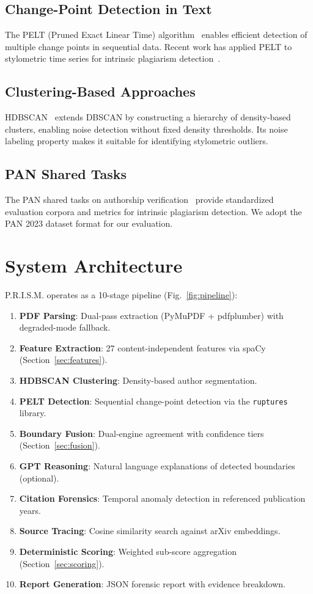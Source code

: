 \documentclass[conference]{IEEEtran}
\begin{document}
\subsection{Change-Point Detection in Text}
The PELT (Pruned Exact Linear Time) algorithm~\cite{killick2012} enables efficient detection of multiple change points in sequential data. Recent work has applied PELT to stylometric time series for intrinsic plagiarism detection~\cite{tschuggnall2017}.

\subsection{Clustering-Based Approaches}
HDBSCAN~\cite{campello2013} extends DBSCAN by constructing a hierarchy of density-based clusters, enabling noise detection without fixed density thresholds. Its noise labeling property makes it suitable for identifying stylometric outliers.

\subsection{PAN Shared Tasks}
The PAN shared tasks on authorship verification~\cite{kestemont2021} provide standardized evaluation corpora and metrics for intrinsic plagiarism detection. We adopt the PAN 2023 dataset format for our evaluation.

\section{System Architecture}
\label{sec:architecture}

P.R.I.S.M. operates as a 10-stage pipeline (Fig.~\ref{fig:pipeline}):

\begin{enumerate}
    \item \textbf{PDF Parsing}: Dual-pass extraction (PyMuPDF + pdfplumber) with degraded-mode fallback.
    \item \textbf{Feature Extraction}: 27 content-independent features via spaCy (Section~\ref{sec:features}).
    \item \textbf{HDBSCAN Clustering}: Density-based author segmentation.
    \item \textbf{PELT Detection}: Sequential change-point detection via the \texttt{ruptures} library.
    \item \textbf{Boundary Fusion}: Dual-engine agreement with confidence tiers (Section~\ref{sec:fusion}).
    \item \textbf{GPT Reasoning}: Natural language explanations of detected boundaries (optional).
    \item \textbf{Citation Forensics}: Temporal anomaly detection in referenced publication years.
    \item \textbf{Source Tracing}: Cosine similarity search against arXiv embeddings.
    \item \textbf{Deterministic Scoring}: Weighted sub-score aggregation (Section~\ref{sec:scoring}).
    \item \textbf{Report Generation}: JSON forensic report with evidence breakdown.
\end{enumerate}
\end{document}

